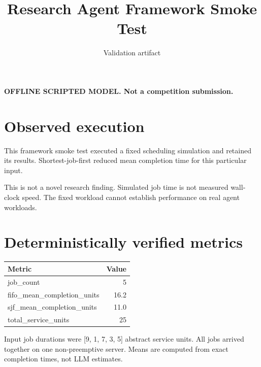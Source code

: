 \documentclass{article}
\begin{document}
\title{Research Agent Framework Smoke Test}\author{Validation artifact}\date{}\maketitle
\textbf{OFFLINE SCRIPTED MODEL. Not a competition submission.}

\section*{Observed execution}
This framework smoke test executed a fixed scheduling simulation and retained its results. Shortest-job-first reduced mean completion time for this particular input.

This is not a novel research finding. Simulated job time is not measured wall-clock speed. The fixed workload cannot establish performance on real agent workloads.

\section*{Deterministically verified metrics}
\begin{tabular}{lr}
Metric & Value \\
\hline
job\_count & 5 \\
fifo\_mean\_completion\_units & 16.2 \\
sjf\_mean\_completion\_units & 11.0 \\
total\_service\_units & 25 \\
\end{tabular}

Input job durations were [9, 1, 7, 3, 5] abstract service units. All jobs arrived together on one non-preemptive server. Means are computed from exact completion times, not LLM estimates.
\end{document}
